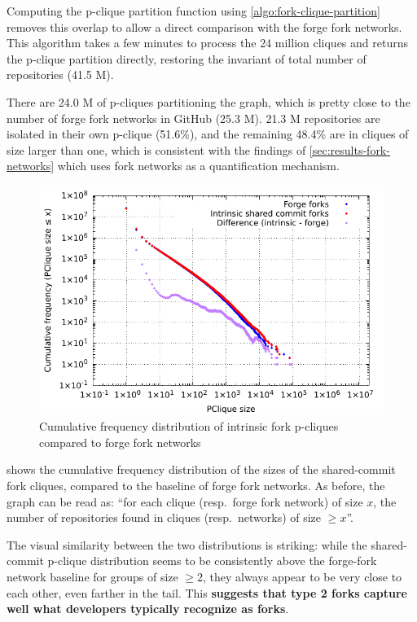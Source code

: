 Computing the p-clique partition function using
\cref{algo:fork-clique-partition} removes this overlap to allow a direct
comparison with the forge fork networks. This algorithm takes a few minutes to
process the 24 million cliques and returns the p-clique partition directly,
restoring the invariant of total number of repositories (41.5 M).

There are 24.0 M of p-cliques partitioning the graph, which is pretty close to
the number of forge fork networks in GitHub (25.3 M).
21.3 M repositories are isolated in their own p-clique (51.6\%), and the
remaining 48.4\% are in cliques of size larger than one, which is consistent
with the findings of \cref{sec:results-fork-networks} which uses fork
networks as a quantification mechanism.

\begin{figure}[t]
    \centering
    \includegraphics[width=0.8\linewidth]{img/forks/fork-clique-partition-freq-distribution.pdf}
    \caption{Cumulative frequency distribution of intrinsic fork p-cliques
    compared to forge fork networks}%
    \label{fig:fork-clique-freq-distrib}
\end{figure}

 shows the cumulative frequency
distribution of the sizes of the shared-commit fork cliques, compared to the
baseline of forge fork networks. As before, the graph can be read as: ``for
each clique (resp.\ forge fork network) of size $x$, the number
of repositories found in cliques (resp.\ networks) of size $\geq x$''.

The visual similarity between the two distributions is striking: while the
shared-commit p-clique distribution seems to be consistently above the
forge-fork network baseline for groups of size $\geq 2$, they always appear to
be very close to each other, even farther in the tail. This \textbf{suggests
that type 2 forks capture well what developers typically recognize as forks}.

